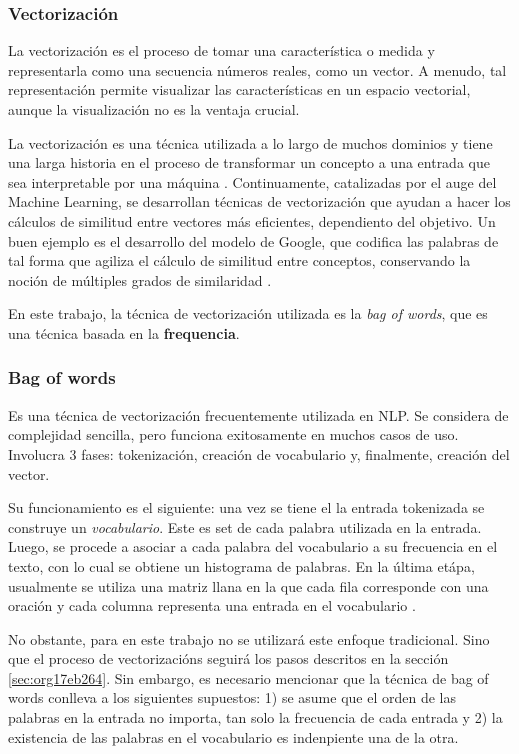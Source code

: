 \documentclass[12pt,letterpaper,twoside]{article}
\begin{document}
\subsubsection{Vectorización}
\label{sec:orgd4e6b0d}
La vectorización es el proceso de tomar una característica o medida
y representarla como una secuencia números reales, como un vector. A menudo,
tal representación permite visualizar las características en un espacio
vectorial, aunque la visualización no es la ventaja crucial.

La vectorización es una técnica utilizada a lo largo de muchos
dominios y tiene una larga historia en el proceso de transformar
un concepto a una entrada que sea interpretable por una máquina
\cite{jha_abhishek_vectorization}.  Continuamente, catalizadas por
el auge del Machine Learning, se desarrollan técnicas de
vectorización que ayudan a hacer los cálculos de similitud entre
vectores más eficientes, dependiento del objetivo. Un buen
ejemplo es el desarrollo del modelo de Google, que
codifica las palabras de tal forma que agiliza el cálculo
de similitud entre conceptos, conservando la noción
de múltiples grados de similaridad \cite{mikolov2013efficient}.

En este trabajo, la técnica de vectorización utilizada es
la \emph{bag of words}, que es una técnica basada en la \textbf{frequencia}.

\subsubsection{Bag of words}
\label{sec:org7a584bc}

Es una técnica de vectorización frecuentemente utilizada en NLP.
Se considera de complejidad sencilla, pero funciona exitosamente
en muchos casos de uso. Involucra 3 fases: tokenización, creación de vocabulario y,
finalmente, creación del vector.

Su funcionamiento es el siguiente: una vez se tiene el la entrada
tokenizada se construye un \emph{vocabulario}.  Este es set de cada
palabra utilizada en la entrada.  Luego, se procede a asociar a
cada palabra del vocabulario a su frecuencia en el texto, con lo
cual se obtiene un histograma de palabras. En la última etápa,
usualmente se utiliza una matriz llana en la que cada fila
corresponde con una oración y cada columna representa una entrada
en el vocabulario \cite{jha_abhishek_vectorization}.

No obstante, para en este trabajo no se utilizará este enfoque
tradicional.  Sino que el proceso de vectorizacións seguirá los
pasos descritos en la sección \ref{sec:org17eb264}. Sin embargo,
es necesario mencionar que la técnica de bag of words conlleva
a los siguientes supuestos: 1) se asume que el orden de las
palabras en la entrada no importa, tan solo la frecuencia
de cada entrada y 2) la existencia de las palabras en el
vocabulario es indenpiente una de la otra.  
\end{document}
